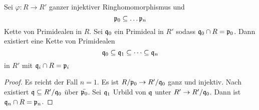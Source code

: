 \begin{Satz}[Going Up] \label{Satz:GoingUp}
	Sei \( \varphi \colon R \to R'\) ganzer injektiver Ringhomomorphismus und \[ \mathfrak{p}_0\subseteq \dots \mathfrak{p}_n \] Kette
	von Primidealen in \( R \). Sei \( \mathfrak{q}_0 \) ein Primideal in \( R ' \) sodass \( \mathfrak{q}_0 \cap R = \mathfrak{p}_0 \).
	Dann existiert eine Kette von Primidealen
	\[ \mathfrak{q}_0 \subseteq \mathfrak{q}_1 \subseteq \dots \subseteq \mathfrak{q}_n \] in \( R' \) 
	mit \( \mathfrak{q}_i \cap R = \mathfrak{p}_i \) 
\end{Satz}
\begin{proof}
	Es reicht der Fall \( n = 1 \).
	Es ist \( R / \mathfrak{p}_0 \to R' / \mathfrak{q}_0 \) ganz und injektiv.
	Nach  existiert \( \mathfrak{q} \subseteq R'/ \mathfrak{q}_0\) über \( \bar{\mathfrak{p}_0} \).
	Sei \( \mathfrak{q}_1 \) Urbild von \( \mathfrak{q} \) unter \( R'\to R'/\mathfrak{q}_0 \). Dann ist \( \mathfrak{q}_n\cap R = \mathfrak{p}_n \).
\end{proof}
